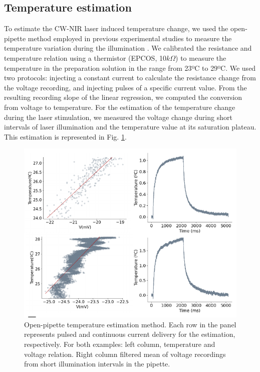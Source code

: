 \subsection{Temperature estimation}
\label{sec:temperature-estimation}
To estimate the CW-NIR laser induced temperature change, we used the open-pipette method employed in previous experimental studies to measure the temperature variation during the illumination \parencite{li_temporal_2013, rabbitt_heat_2016,brown_thermal_2020, brown_response_2021}. We calibrated the resistance and temperature relation using a thermistor (EPCOS, 10$k\Omega$) to measure the temperature in the preparation solution in the range from 23ºC to 29ºC. We used two protocols:  injecting a constant current to calculate the resistance change from the voltage recording, and injecting pulses of a specific current value. From the resulting recording slope of the linear regression, we computed the conversion from voltage to temperature. For the estimation of the temperature change during the laser stimulation, we measured the voltage change during short intervals of laser illumination and the temperature value at its saturation plateau. This estimation is represented in Fig. \ref{fig:temperature estimation}.



\begin{figure}[htb!]
	\includegraphics[width=\textwidth]{img/laser/temperature_estimation.pdf}
	\caption{Open-pipette temperature estimation method. Each row in the panel represents pulsed and continuous current delivery for the estimation, respectively. For both examples: left column, temperature and voltage relation. Right column filtered mean of voltage recordings from short illumination intervals in the pipette. }
	\label{fig:temperature estimation}
\end{figure}

